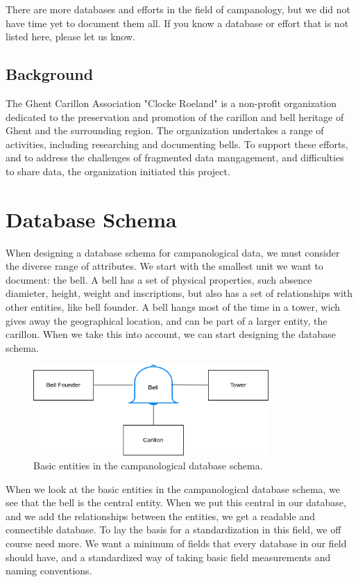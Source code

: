 \documentclass[11pt, a4paper]{article}
\begin{document}
There are more databases and efforts in the field of campanology, but we did not have time yet to document them all. If you know a database or effort that is not listed here, please let us know.

\subsection{Background}

The Ghent Carillon Association "Clocke Roeland" is a non-profit organization dedicated to the preservation and promotion of the carillon and bell heritage of Ghent and the surrounding region. The organization undertakes a range of activities, including researching and documenting bells. To support these efforts, and to address the challenges of fragmented data mangagement, and difficulties to share data, the organization initiated this project.
    
\section{Database Schema}

When designing a database schema for campanological data, we must consider the diverse range of attributes. We start with the smallest unit we want to document: the bell. A bell has a set of physical properties, such absence diamieter, height, weight and inscriptions, but also has a set of relationships with other entities, like bell founder. A bell hangs most of the time in a tower, wich gives away the geographical location, and can be part of a larger entity, the carillon. When we take this into account, we can start designing the database schema.

\begin{figure}[h!]
    \centering
    \includegraphics[width=0.8\textwidth]{images/basic_entities.png}
    \caption{Basic entities in the campanological database schema.}
    \label{fig:basic-entities}
\end{figure}

When we look at the basic entities in the campanological database schema, we see that the bell is the central entity. When we put this central in our database, and we add the relationships between the entities, we get a readable and 
connectible database. To lay the basis for a standardization in this field, we off course need more. We want a minimum of fields that every database in our field should have, and a standardized way of taking basic field measurements and naming conventions.
\end{document}
